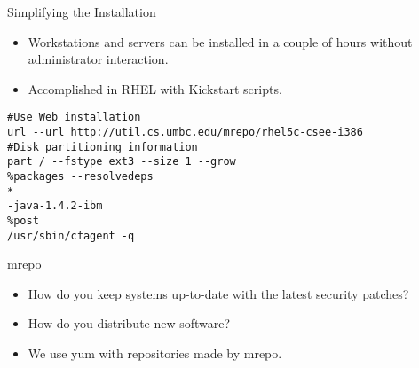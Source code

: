 \documentclass[default,pdf,colorBG,slideColor]{prosper}
\begin{document}


\begin{slide}{Simplifying the Installation}
\begin{itemize}
\item Workstations and servers can be installed in a couple of hours without administrator interaction.
\item Accomplished in RHEL with Kickstart scripts.
\end{itemize}
\scriptsize
\begin{verbatim}
#Use Web installation
url --url http://util.cs.umbc.edu/mrepo/rhel5c-csee-i386
#Disk partitioning information
part / --fstype ext3 --size 1 --grow 
%packages --resolvedeps
*
-java-1.4.2-ibm
%post
/usr/sbin/cfagent -q
\end{verbatim}
\end{slide}

\begin{slide}{mrepo}
\begin{itemize}
\item How do you keep systems up-to-date with the latest security patches?
\item How do you distribute new software? %
\item We use yum with repositories made by mrepo. %

\end{itemize}
\end{slide}
\end{document}
